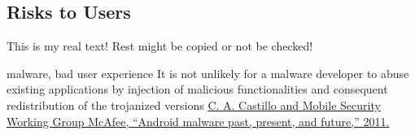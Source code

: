 \subsection{Risks to Users} \label{subsection:foundation-piracy-users}
This is my real text! Rest might be copied or not be checked!


malware, bad user experience\newline
It is not unlikely for a malware developer to abuse existing applications by injection of malicious functionalities and consequent redistribution of the trojanized versions \url{C. A. Castillo and Mobile Security Working Group McAfee, “Android malware past, present, and future,” 2011.}
